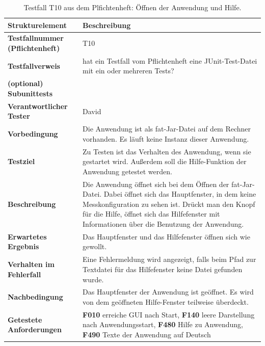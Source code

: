 \documentclass[parskip=full]{scrartcl}
\begin{document}
\begin{table}[h]
\begin{tabular}{| p{4cm} | p{10cm} |}
	\hline
	\textbf{Strukturelement} & \textbf{Beschreibung} \\ \hline
	\textbf{Testfallnummer (Pflichtenheft)}
	& 
	T10
	\\ \hline
	
	\textbf{Testfallverweis}
	& 
	hat ein Testfall vom Pflichtenheft eine JUnit-Test-Datei mit ein oder mehreren Tests?
	\\ \hline
	
	\textbf{(optional) Subunittests}
	& 
	\\ \hline
	
	\textbf{Verantwortlicher Tester}
	& 
	David
	\\ \hline
	
	
	\textbf{Vorbedingung}
	& 
	Die Anwendung ist als fat-Jar-Datei auf dem Rechner vorhanden. Es läuft keine Instanz dieser Anwendung.
	\\ \hline
	
	\textbf{ Testziel}
	& 
	Zu Testen ist das Verhalten des Anwendung, wenn sie gestartet wird. Außerdem soll die Hilfe-Funktion der Anwendung getestet werden.
	\\ \hline
	
	
	\textbf{Beschreibung}
	& 
	Die Anwendung öffnet sich bei dem Öffnen der fat-Jar-Datei. Dabei öffnet sich das Hauptfenster, in dem keine Messkonfiguration zu sehen ist. Drückt man den Knopf für die Hilfe, öffnet sich das Hilfefenster mit Informationen über die Benutzung der Anwendung.
	\\ \hline
	
	\textbf{Erwartetes Ergebnis}
	& 
	Das Hauptfenster und das Hilfefenster öffnen sich wie gewollt.
	\\ \hline
			
	\textbf{Verhalten im Fehlerfall}
	& 
	Eine Fehlermeldung wird angezeigt, falls beim Pfad zur Textdatei für das Hilfefenster keine Datei gefunden wurde.
	\\ \hline
	
	\textbf{Nachbedingung}
	& 
	Das Hauptfenster der Anwendung ist geöffnet. Es wird von dem geöffneten Hilfe-Fenster teilweise überdeckt.
	\\ \hline
	
	
	\textbf{Getestete Anforderungen}
	& 
	\textbf{F010} erreiche GUI nach Start, \textbf{F140} leere Darstellung nach Anwendungsstart, \textbf{F480} Hilfe zu Anwendung, \textbf{F490} Texte der Anwendung auf Deutsch
	\\ \hline
	
	
	
\end{tabular}
\caption{Testfall T10 aus dem Plfichtenheft: Öffnen der Anwendung und Hilfe.}
\label{testfallT10}
\end{table}
\end{document}
